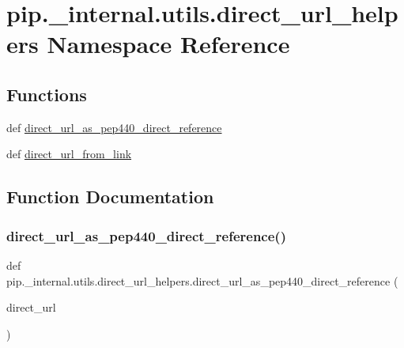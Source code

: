 \hypertarget{namespacepip_1_1__internal_1_1utils_1_1direct__url__helpers}{}\section{pip.\+\_\+internal.\+utils.\+direct\+\_\+url\+\_\+helpers Namespace Reference}
\label{namespacepip_1_1__internal_1_1utils_1_1direct__url__helpers}
\subsection*{Functions}
\begin{DoxyCompactItemize}
\item 
def \hyperlink{namespacepip_1_1__internal_1_1utils_1_1direct__url__helpers_ac8b78fbbe31f5d90f9166c8d3c466ab0}{direct\+\_\+url\+\_\+as\+\_\+pep440\+\_\+direct\+\_\+reference}
\item 
def \hyperlink{namespacepip_1_1__internal_1_1utils_1_1direct__url__helpers_a2b2f918abc0fc549b3f64c7d870c9067}{direct\+\_\+url\+\_\+from\+\_\+link}
\end{DoxyCompactItemize}


\subsection{Function Documentation}
\mbox{\label{namespacepip_1_1__internal_1_1utils_1_1direct__url__helpers_ac8b78fbbe31f5d90f9166c8d3c466ab0}} 
\subsubsection{\texorpdfstring{direct\+\_\+url\+\_\+as\+\_\+pep440\+\_\+direct\+\_\+reference()}{direct\_url\_as\_pep440\_direct\_reference()}}
{\footnotesize\ttfamily def pip.\+\_\+internal.\+utils.\+direct\+\_\+url\+\_\+helpers.\+direct\+\_\+url\+\_\+as\+\_\+pep440\+\_\+direct\+\_\+reference (\begin{DoxyParamCaption}\item[{}]{direct\+\_\+url }\end{DoxyParamCaption})}

